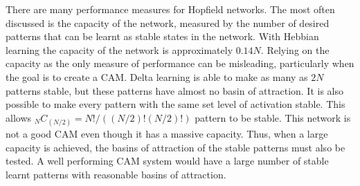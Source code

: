 There are many performance measures for Hopfield networks.  The most often discussed is the capacity of the network, measured by the number of desired patterns that can be learnt as stable states in the network.  With Hebbian learning the capacity of the network is approximately $0.14N$.  Relying on the capacity as the only measure of performance can be misleading, particularly when the goal is to create a CAM.  Delta learning is able to make as many as $2N$ patterns stable, but these patterns have almost no basin of attraction.  It is also possible to make every pattern with the same set level of activation stable.  This allows ${}_N C_{(N/2)} = N!/((N/2)!(N/2)!)$ pattern to be stable.  This network is not a good CAM even though it has a massive capacity.  Thus, when a large capacity is achieved, the basins of attraction of the stable patterns must also be tested.  A well performing CAM system would have a large number of stable learnt patterns with reasonable basins of attraction.